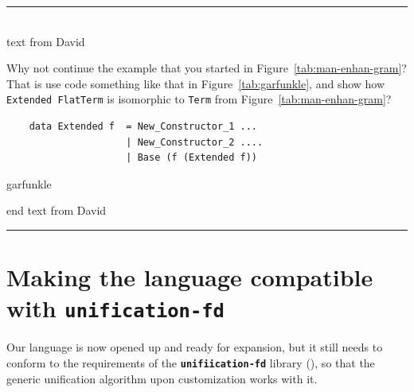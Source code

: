 \documentclass[thesis-solanki.tex]{subfiles}
\providecommand\codeLibrary[1]{\texttt{\bfseries #1}}
\begin{document}
\begin{center}
  \textcolor{blue}{\rule{0.95\textwidth}{0.2em}}\\[-1ex]
  text from David
\end{center}
Why not continue the example that you started in Figure~\ref{tab:man-enhan-gram}?
That is use code something like that in Figure~\ref{tab:garfunkle}, and show how
\Verb!Extended FlatTerm! is isomorphic to \Verb!Term! from Figure~\ref{tab:man-enhan-gram}?

\begin{code-list}[h]
  \begin{verbatim}
    data Extended f  = New_Constructor_1 ...
                     | New_Constructor_2 ....
                     | Base (f (Extended f))
  \end{verbatim}
  \caption{garfunkle}
  \label{tab:garfunkle}
\end{code-list}
\vspace*{-1.5\baselineskip}
\begin{center}
  end text from David\\[-3ex]
  \textcolor{blue}{\rule{0.95\textwidth}{1pt}}
\end{center}

\section{Making the language compatible with \protect\codeLibrary{unification-fd}}\label{sec:making-lang-comp}


Our language is now opened up and 
ready for expansion,
but it still needs to conform to the requirements of
the \codeLibrary{unifiication-fd} library
  (\cite{unification-fd-lib}), so that the generic unification algorithm upon customization works
with it.
\end{document}

